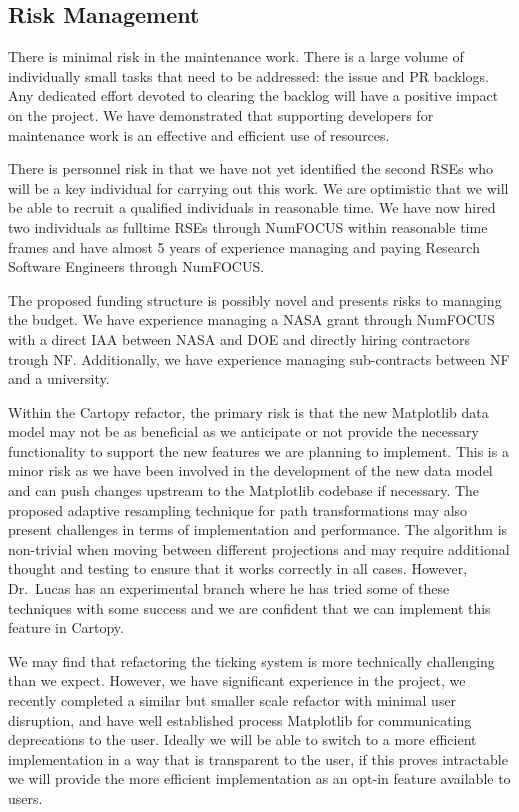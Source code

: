 \documentclass[12pt]{article}
\numberwithin{page}{section}
\begin{document}
\subsection{Risk Management}

There is minimal risk in the maintenance work.  There is a large volume
of individually small tasks that need to be addressed: the issue and
PR backlogs.  Any dedicated effort devoted to clearing the backlog
will have a positive impact on the project.  We have demonstrated that
supporting developers for maintenance work is an effective and
efficient use of resources.


There is personnel risk in that we have not yet identified the second RSEs who
will be a key individual for carrying out this work.  We are optimistic that we
will be able to recruit a qualified individuals in reasonable time.  We have
now hired two individuals as fulltime RSEs through NumFOCUS within reasonable
time frames and have almost 5 years of experience managing and paying
Research Software Engineers through NumFOCUS.


The proposed funding structure is possibly novel and presents risks to managing
the budget.   We have experience managing a NASA grant through NumFOCUS with a
direct IAA between NASA and DOE and directly hiring contractors trough NF.
Additionally, we have experience managing sub-contracts between NF and a
university.

Within the Cartopy refactor, the primary risk is that the new Matplotlib data
model may not be as beneficial as we anticipate or not provide the necessary
functionality to support the new features we are planning to implement. This is
a minor risk as we have been involved in the development of the new data model
and can push changes upstream to the Matplotlib codebase if necessary.
The proposed adaptive resampling technique for path transformations may also
present challenges in terms of implementation and performance. The algorithm
is non-trivial when moving between different projections and may require additional
thought and testing to ensure that it works correctly in all cases.
However, Dr.\ Lucas has an experimental branch where he has tried some of these
techniques with some success and we are confident that we can implement this
feature in Cartopy.

We may find that refactoring the ticking system is more technically challenging
than we expect.  However, we have significant experience in the project, we
recently completed a similar but smaller scale refactor with minimal user
disruption, and have well established process Matplotlib for communicating
deprecations to the user.  Ideally we will be able to switch to a more
efficient implementation in a way that is transparent to the user, if this proves
intractable we will provide the more efficient implementation as an opt-in feature
available to users.
\end{document}
